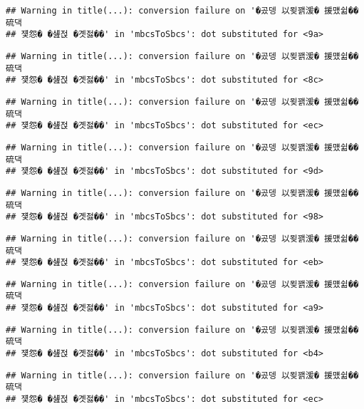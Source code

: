 \documentclass[
]{article}
\begin{document}
\begin{verbatim}
## Warning in title(...): conversion failure on '�곴뎅 以묒꽭湲� 援먰쉶�� 硫댁
## 쟻怨� �섎젅 �곗젏��' in 'mbcsToSbcs': dot substituted for <9a>
\end{verbatim}

\begin{verbatim}
## Warning in title(...): conversion failure on '�곴뎅 以묒꽭湲� 援먰쉶�� 硫댁
## 쟻怨� �섎젅 �곗젏��' in 'mbcsToSbcs': dot substituted for <8c>
\end{verbatim}

\begin{verbatim}
## Warning in title(...): conversion failure on '�곴뎅 以묒꽭湲� 援먰쉶�� 硫댁
## 쟻怨� �섎젅 �곗젏��' in 'mbcsToSbcs': dot substituted for <ec>
\end{verbatim}

\begin{verbatim}
## Warning in title(...): conversion failure on '�곴뎅 以묒꽭湲� 援먰쉶�� 硫댁
## 쟻怨� �섎젅 �곗젏��' in 'mbcsToSbcs': dot substituted for <9d>
\end{verbatim}

\begin{verbatim}
## Warning in title(...): conversion failure on '�곴뎅 以묒꽭湲� 援먰쉶�� 硫댁
## 쟻怨� �섎젅 �곗젏��' in 'mbcsToSbcs': dot substituted for <98>
\end{verbatim}

\begin{verbatim}
## Warning in title(...): conversion failure on '�곴뎅 以묒꽭湲� 援먰쉶�� 硫댁
## 쟻怨� �섎젅 �곗젏��' in 'mbcsToSbcs': dot substituted for <eb>
\end{verbatim}

\begin{verbatim}
## Warning in title(...): conversion failure on '�곴뎅 以묒꽭湲� 援먰쉶�� 硫댁
## 쟻怨� �섎젅 �곗젏��' in 'mbcsToSbcs': dot substituted for <a9>
\end{verbatim}

\begin{verbatim}
## Warning in title(...): conversion failure on '�곴뎅 以묒꽭湲� 援먰쉶�� 硫댁
## 쟻怨� �섎젅 �곗젏��' in 'mbcsToSbcs': dot substituted for <b4>
\end{verbatim}

\begin{verbatim}
## Warning in title(...): conversion failure on '�곴뎅 以묒꽭湲� 援먰쉶�� 硫댁
## 쟻怨� �섎젅 �곗젏��' in 'mbcsToSbcs': dot substituted for <ec>
\end{verbatim}
\end{document}
